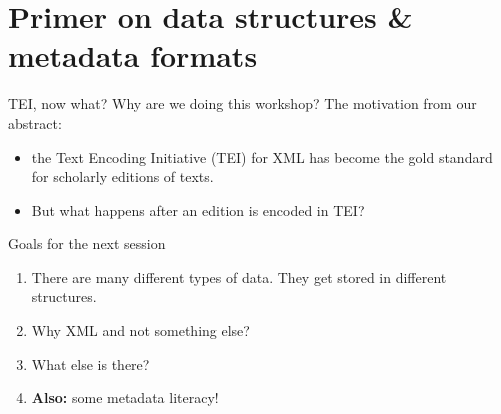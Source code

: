 \section{Primer on data structures \& metadata formats}

\begin{frame}{TEI, now what?}
    Why are we doing this workshop? The motivation from our abstract:
    \begin{itemize}
        \item \punkti the Text Encoding Initiative (TEI) for XML has become the gold standard for scholarly editions of texts.
        \item But what happens after an edition is encoded in TEI? 
    \end{itemize}
    
    \begin{block}{Goals for the next session}
    \begin{enumerate}
        \item There are many different types of data. They get stored in different structures. 
        \item Why XML and not something else?
        \item What else is there? 
        \item \textbf{Also:} some metadata literacy!
    \end{enumerate}
    \end{block}
\end{frame}

